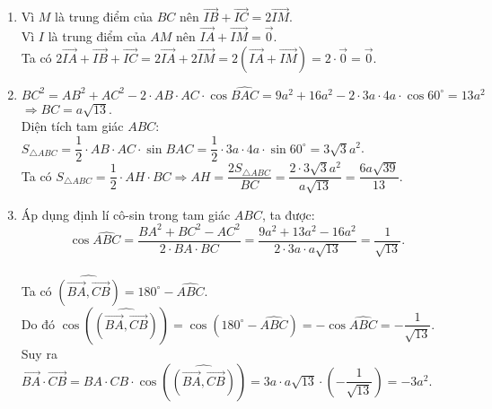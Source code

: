 \begin{bt}
{\begin{center}
		\end{center}
		\begin{enumerate}
		\item
		Vì $M$ là trung điểm của $BC$ nên $\overrightarrow{IB} + \overrightarrow{IC} =2\overrightarrow{IM}$.\\
		Vì $I$ là trung điểm của $AM$ nên $\overrightarrow{IA} +\overrightarrow{IM}=\overrightarrow{0}$.\\
		Ta có 
		 $2\overrightarrow{IA}+\overrightarrow{IB}+\overrightarrow{IC}=2\overrightarrow{IA} + 2\overrightarrow{IM} = 2 \left( \overrightarrow{IA} + \overrightarrow{IM} \right) =2\cdot\overrightarrow{0}= \overrightarrow{0} $.
		\item $BC^2=AB^2 +AC^2 -2\cdot AB\cdot AC\cdot \cos{\widehat{BAC}}=9a^2 +16a^2 -2\cdot 3a\cdot 4a\cdot \cos{60^\circ}=13a^2$\\
		$ \Rightarrow BC= a\sqrt{13}$. \\
		Diện tích tam giác $ABC$: $S_{\triangle ABC}= \dfrac{1}{2}\cdot AB\cdot AC\cdot \sin{\widehat{BAC}}=\dfrac{1}{2}\cdot 3a\cdot 4a\cdot \sin{60^\circ}=3\sqrt{3}a^2$. \\
		Ta có $S_{\triangle ABC}= \dfrac{1}{2}\cdot AH\cdot BC \Rightarrow AH=\dfrac{2S_{\triangle ABC}}{BC}=\dfrac{2\cdot 3\sqrt{3}a^2}{a\sqrt{13}
		}=\dfrac{6a\sqrt{39}}{13}$.
		\item 
		Áp dụng định lí cô-sin trong tam giác $ABC$, ta được:
		$$\cos \widehat{ABC} =\dfrac{BA^2 +BC^2 -AC^2}{2\cdot BA\cdot BC} =\dfrac{9a^2 +13a^2-16a^2}{2\cdot 3a\cdot a\sqrt{13}}=\dfrac{1}{\sqrt{13}}.$$\\
		Ta có $\widehat{\left( \overrightarrow{BA}, \overrightarrow{CB} \right)} =180^\circ -\widehat{ABC}$.\\
		Do đó $\cos{\left( \widehat{\left( \overrightarrow{BA}, \overrightarrow{CB} \right)}\right)}=\cos{\left(  180^\circ -\widehat{ABC}\right)}=-\cos{\widehat{ABC}}=-\dfrac{1}{\sqrt{13}}$.\\
		Suy ra
		$\overrightarrow{BA}\cdot\overrightarrow{CB}=BA\cdot CB\cdot  \cos{\left( \widehat{\left( \overrightarrow{BA}, \overrightarrow{CB} \right)}\right)}=3a\cdot a\sqrt{13}\cdot \left(-\dfrac{1}{\sqrt{13}}\right)=-3a^2$.
	\end{enumerate}


}
\end{bt}
